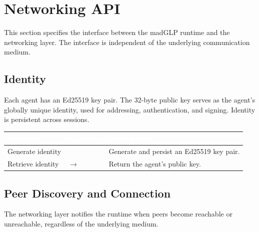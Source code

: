 \section{Networking API}
\label{sec:api}
This section specifies the interface between the madGLP runtime and the networking layer. The interface is independent of the underlying communication medium.
\subsection{Identity}
\label{sec:identity}
Each agent has an Ed25519 key pair. The 32-byte public key serves as the agent's globally unique identity, used for addressing, authentication, and signing. Identity is persistent across sessions.
\begin{longtable}{L{4cm} L{4.5cm} L{5.5cm}}
\toprule
{}
\textcolor{white}{\textbf{Function}} &
\textcolor{white}{\textbf{Signature}} &
\textcolor{white}{\textbf{Description}} \\
\midrule
\endhead
Generate identity &  & Generate and persist an Ed25519 key pair. \\
Retrieve identity &  $\to$  & Return the agent's public key. \\
\bottomrule
\end{longtable}
\subsection{Peer Discovery and Connection}
\label{sec:discovery}
The networking layer notifies the runtime when peers become reachable or unreachable, regardless of the underlying medium.

